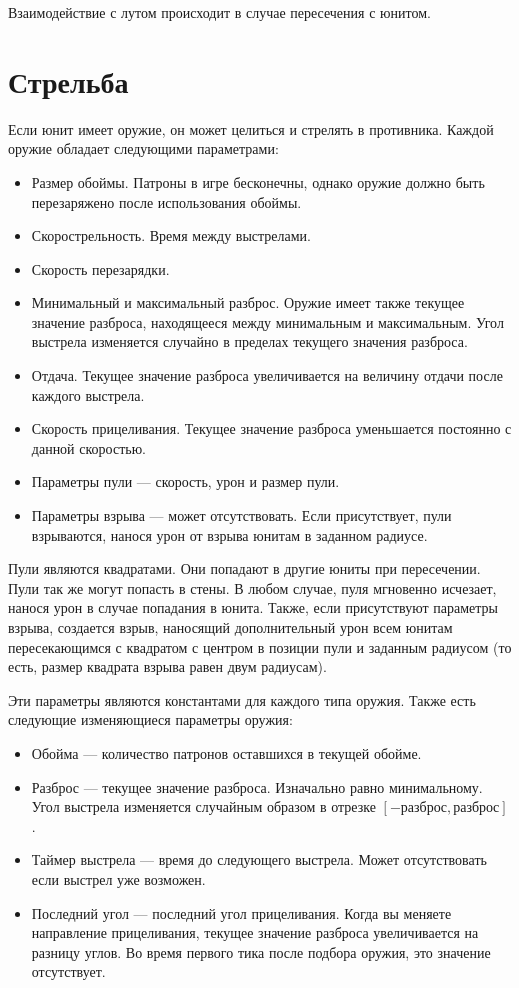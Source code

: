 Взаимодействие с лутом происходит в случае пересечения с юнитом.

\section{Стрельба}

Если юнит имеет оружие, он может целиться и стрелять в противника. Каждой оружие обладает следующими параметрами:
\begin{itemize}
      \item Размер обоймы. Патроны в игре бесконечны, однако оружие должно быть перезаряжено после использования обоймы.
      \item Скорострельность. Время между выстрелами.
      \item Скорость перезарядки.
      \item Минимальный и максимальный разброс. Оружие имеет также текущее значение разброса, находящееся между минимальным и максимальным.
            Угол выстрела изменяется случайно в пределах текущего значения разброса.
      \item Отдача. Текущее значение разброса увеличивается на величину отдачи после каждого выстрела.
      \item Скорость прицеливания. Текущее значение разброса уменьшается постоянно с данной скоростью.
      \item Параметры пули --- скорость, урон и размер пули.
      \item Параметры взрыва --- может отсутствовать.
            Если присутствует, пули взрываются, нанося урон от взрыва юнитам в заданном радиусе.
\end{itemize}

Пули являются квадратами. Они попадают в другие юниты при пересечении.
Пули так же могут попасть в стены.
В любом случае, пуля мгновенно исчезает, нанося урон в случае попадания в юнита.
Также, если присутствуют параметры взрыва, создается взрыв, наносящий дополнительный урон всем юнитам пересекающимся с квадратом
с центром в позиции пули и заданным радиусом (то есть, размер квадрата взрыва равен двум радиусам).

Эти параметры являются константами для каждого типа оружия. Также есть следующие изменяющиеся параметры оружия:
\begin{itemize}
      \item Обойма --- количество патронов оставшихся в текущей обойме.
      \item Разброс --- текущее значение разброса. Изначально равно минимальному.
            Угол выстрела изменяется случайным образом в отрезке $[-разброс, разброс]$.
      \item Таймер выстрела --- время до следующего выстрела. Может отсутствовать если выстрел уже возможен.
      \item Последний угол --- последний угол прицеливания. Когда вы меняете направление прицеливания,
            текущее значение разброса увеличивается на разницу углов.
            Во время первого тика после подбора оружия, это значение отсутствует.
\end{itemize}

